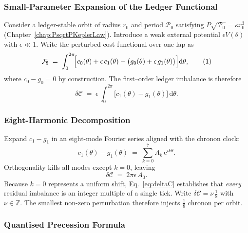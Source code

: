 \documentclass[11pt,oneside]{book}
\begin{document}

\subsubsection{Small-Parameter Expansion of the Ledger Functional}
\label{ss:periapsis-setup}

Consider a ledger-stable orbit of radius $r_{0}$ and period $\mathscr P_{0}$
satisfying $P\sqrt{\mathscr P_{0}}=\kappa r_{0}^{3}$ (Chapter~\ref{chap:PsqrtPKeplerLaw}).
Introduce a weak external potential $\epsilon V(\theta)$ with
$\epsilon\ll1$.  
Write the perturbed cost functional over one lap as
\[
   \mathcal F_{\!8}
   \;=\;
   \int_{0}^{2\pi}\!
      \Bigl[
         c_{0}(\theta)+\epsilon\,c_{1}(\theta)
         -\bigl(g_{0}(\theta)+\epsilon\,g_{1}(\theta)\bigr)
      \Bigr]
      \mathrm d\theta,
   \tag{1}
\]
where $c_{0}-g_{0}=0$ by construction.  The first–order ledger
imbalance is therefore
\[
   \delta\!\mathcal C
   \;=\;
   \epsilon\,
   \int_{0}^{2\pi}\!\!
      \bigl[c_{1}(\theta)-g_{1}(\theta)\bigr]\,\mathrm d\theta.
   \tag{2}
\]

\subsubsection{Eight-Harmonic Decomposition}
\label{ss:periapsis-harmonics}

Expand $c_{1}-g_{1}$ in an eight-mode Fourier series aligned with the
chronon clock:
\[
   c_{1}(\theta)-g_{1}(\theta)
   \;=\;
   \sum_{k=0}^{7}
      A_{k}\,
      \mathrm e^{ik\theta}.
   \tag{3}
\]
Orthogonality kills all modes except $k=0$, leaving
\[
   \delta\!\mathcal C
   \;=\;
   2\pi\epsilon\,A_{0}.
   \tag{4}
   \label{eq:deltaC}
\]
Because $k=0$ represents a uniform shift, Eq.~\eqref{eq:deltaC}
establishes that \emph{every} residual imbalance is an integer
multiple of a single tick.  Write
$\delta\!\mathcal C = \nu\,\tfrac{1}{8}$ with
$\nu\in\mathbb Z$.  The smallest non-zero perturbation therefore
injects \(\tfrac{1}{8}\) chronon per orbit.

\subsubsection{Quantised Precession Formula}
\label{ss:periapsis-drift}
\end{document}
